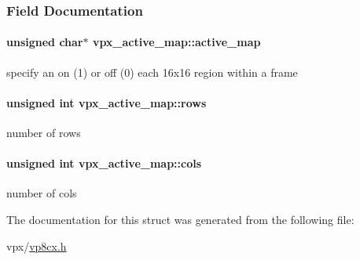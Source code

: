 \subsubsection{Field Documentation}
\hypertarget{structvpx__active__map_a6e5e092e766ae3f65d280c68c9f6df82}{
\paragraph[{active\+\_\+map}]{\setlength{\rightskip}{0pt plus 5cm}unsigned char$\ast$ vpx\+\_\+active\+\_\+map\+::active\+\_\+map}}\label{structvpx__active__map_a6e5e092e766ae3f65d280c68c9f6df82}
specify an on (1) or off (0) each 16x16 region within a frame \hypertarget{structvpx__active__map_a29424c92ff201f97db9bf62d16dfab4d}{
\paragraph[{rows}]{\setlength{\rightskip}{0pt plus 5cm}unsigned int vpx\+\_\+active\+\_\+map\+::rows}}\label{structvpx__active__map_a29424c92ff201f97db9bf62d16dfab4d}
number of rows \hypertarget{structvpx__active__map_a310edb5efc62d596b2c276e3f7d1b42a}{
\paragraph[{cols}]{\setlength{\rightskip}{0pt plus 5cm}unsigned int vpx\+\_\+active\+\_\+map\+::cols}}\label{structvpx__active__map_a310edb5efc62d596b2c276e3f7d1b42a}
number of cols 

The documentation for this struct was generated from the following file\+:\begin{DoxyCompactItemize}
\item 
vpx/\hyperlink{vp8cx_8h}{vp8cx.\+h}\end{DoxyCompactItemize}
